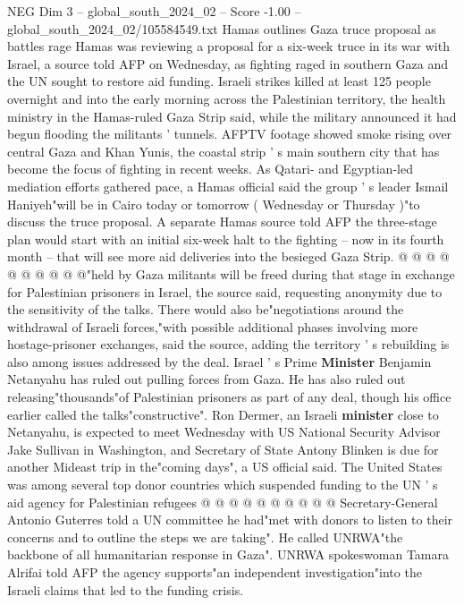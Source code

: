 \begin{textsample}{NEG Dim 3 – global\_south\_2024\_02 – Score -1.00 – global\_south\_2024\_02/105584549.txt}  \label{ex:f3_neg_085}
Hamas outlines Gaza truce proposal as battles rage Hamas was reviewing a proposal for a six-week truce in its war with Israel, a source told AFP on Wednesday, as fighting raged in southern Gaza and the UN sought to restore aid funding.
Israeli strikes killed at least 125 people overnight and into the early morning across the Palestinian territory, the health ministry in the Hamas-ruled Gaza Strip said, while the military announced it had begun flooding the militants ' tunnels.
AFPTV footage showed smoke rising over central Gaza and Khan Yunis, the coastal strip ' s main southern city that has become the focus of fighting in recent weeks.
As Qatari- and Egyptian-led mediation efforts gathered pace, a Hamas official said the group ' s leader Ismail Haniyeh"will be in Cairo today or tomorrow ( Wednesday or Thursday )"to discuss the truce proposal.
A separate Hamas source told AFP the three-stage plan would start with an initial six-week halt to the fighting -- now in its fourth month -- that will see more aid deliveries into the besieged Gaza Strip. @ @ @ @ @ @ @ @ @ @"held by Gaza militants will be freed during that stage in exchange for Palestinian prisoners in Israel, the source said, requesting anonymity due to the sensitivity of the talks.
There would also be"negotiations around the withdrawal of Israeli forces,"with possible additional phases involving more hostage-prisoner exchanges, said the source, adding the territory ' s rebuilding is also among issues addressed by the deal.
Israel ' s Prime \textbf{Minister} Benjamin Netanyahu has ruled out pulling forces from Gaza.
He has also ruled out releasing"thousands"of Palestinian prisoners as part of any deal, though his office earlier called the talks"constructive".
Ron Dermer, an Israeli \textbf{minister} close to Netanyahu, is expected to meet Wednesday with US National Security Advisor Jake Sullivan in Washington, and Secretary of State Antony Blinken is due for another Mideast trip in the"coming days", a US official said.
The United States was among several top donor countries which suspended funding to the UN ' s aid agency for Palestinian refugees @ @ @ @ @ @ @ @ @ @ Secretary-General Antonio Guterres told a UN committee he had"met with donors to listen to their concerns and to outline the steps we are taking".
He called UNRWA"the backbone of all humanitarian response in Gaza".
UNRWA spokeswoman Tamara Alrifai told AFP the agency supports"an independent investigation"into the Israeli claims that led to the funding crisis.

\end{textsample}
